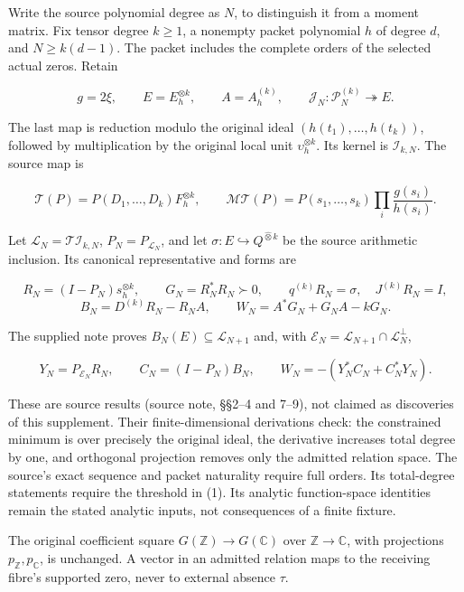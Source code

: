 \documentclass[
]{article}
\begin{document}
Write the source polynomial degree as \(N\), to distinguish it from a
moment matrix. Fix tensor degree \(k\ge1\), a nonempty packet polynomial
\(h\) of degree \(d\), and \(N\ge k(d-1)\). The packet includes the
complete orders of the selected actual zeros. Retain

\[
g=2\xi,\qquad E=E_h^{\otimes k},\qquad A=A_h^{(k)},\qquad
\mathcal J_N:\mathcal P_N^{(k)}\twoheadrightarrow E.
\tag{1}
\]

The last map is reduction modulo the original ideal
\((h(t_1),\ldots,h(t_k))\), followed by multiplication by the original
local unit \(\upsilon_h^{\otimes k}\). Its kernel is
\(\mathcal I_{k,N}\). The source map is

\[
\mathcal T(P)=P(D_1,\ldots,D_k)F_h^{\otimes k},\qquad
\mathcal M\mathcal T(P)=P(s_1,\ldots,s_k)\prod_i\frac{g(s_i)}{h(s_i)}.
\tag{2}
\]

Let \(\mathcal L_N=\mathcal T\mathcal I_{k,N}\),
\(P_N=P_{\mathcal L_N}\), and let
\(\sigma:E\hookrightarrow Q^{\widehat\otimes k}\) be the source
arithmetic inclusion. Its canonical representative and forms are

\[
R_N=(I-P_N)s_h^{\otimes k},\qquad G_N=R_N^*R_N\succ0,
\qquad q^{(k)}R_N=\sigma,\quad J^{(k)}R_N=I,
\tag{3}
\] \[
B_N=D^{(k)}R_N-R_NA,\qquad
W_N=A^*G_N+G_NA-kG_N.
\tag{4}
\]

The supplied note proves \(B_N(E)\subseteq\mathcal L_{N+1}\) and, with
\(\mathcal E_N=\mathcal L_{N+1}\cap\mathcal L_N^\perp\),

\[
Y_N=P_{\mathcal E_N}R_N,
\qquad C_N=(I-P_N)B_N,
\qquad W_N=-(Y_N^*C_N+C_N^*Y_N).
\tag{5}
\]

These are source results (source note, §§2--4 and 7--9), not claimed as
discoveries of this supplement. Their finite-dimensional derivations
check: the constrained minimum is over precisely the original ideal, the
derivative increases total degree by one, and orthogonal projection
removes only the admitted relation space. The source's exact sequence
and packet naturality require full orders. Its total-degree statements
require the threshold in (1). Its analytic function-space identities
remain the stated analytic inputs, not consequences of a finite fixture.

The original coefficient square \(G(\mathbb Z)\to G(\mathbb C)\) over
\(\mathbb Z\to\mathbb C\), with projections \(p_\mathbb Z,p_\mathbb C\),
is unchanged. A vector in an admitted relation maps to the receiving
fibre's supported zero, never to external absence \(\tau\).
\end{document}
